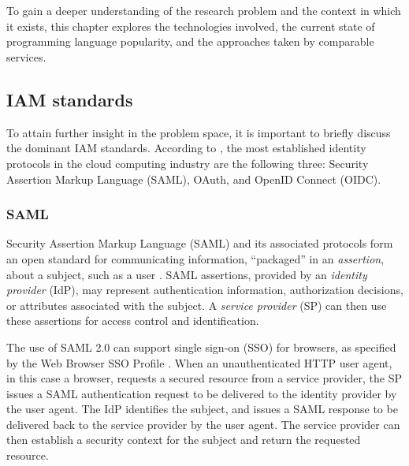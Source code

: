 \chapter{}%
\label{ch:stand-van-zaken}



To gain a deeper understanding of the research problem and the context in which it exists, this chapter explores the technologies involved, the current state of programming language popularity, and the approaches taken by comparable services.

\section{IAM standards}
To attain further insight in the problem space, it is important to briefly discuss the dominant IAM standards. According to \textcite{Naik2016}, the most established identity protocols in the cloud computing industry are the following three: Security Assertion Markup Language (SAML), OAuth, and OpenID Connect (OIDC). 

\subsection{SAML}
Security Assertion Markup Language (SAML) and its associated protocols form an open standard for communicating information, ``packaged'' in an \emph{assertion}, about a subject, such as a user \autocite{Kemp2005}. SAML assertions, provided by an \emph{identity provider} (IdP), may represent authentication information, authorization decisions, or attributes associated with the subject. A \emph{service provider} (SP) can then use these assertions for access control and identification.

The use of SAML 2.0 can support single sign-on (SSO) for browsers, as specified by the Web Browser SSO Profile \autocite{Hughes2005}. When an unauthenticated HTTP user agent, in this case a browser, requests a secured resource from a service provider, the SP issues a SAML authentication request to be delivered to the identity provider by the user agent. The IdP identifies the subject, and issues a SAML response to be delivered back to the service provider by the user agent. The service provider can then establish a security context for the subject and return the requested resource. 


